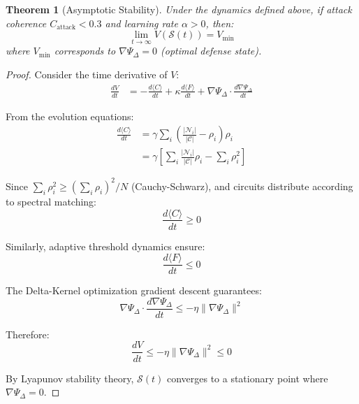 \documentclass[11pt,a4paper]{article}
\newtheorem{theorem}{Theorem}[section]
\begin{document}
\begin{theorem}[Asymptotic Stability]
Under the dynamics defined above, if attack coherence $C_{\text{attack}} < 0.3$ and learning rate $\alpha > 0$, then:
\begin{equation}
\lim_{t \to \infty} V(\mathcal{S}(t)) = V_{\min}
\end{equation}
where $V_{\min}$ corresponds to $\nabla \Psi_\Delta = 0$ (optimal defense state).
\end{theorem}

\begin{proof}
Consider the time derivative of $V$:
\begin{align}
\frac{dV}{dt} &= -\frac{d\langle C \rangle}{dt} + \kappa \frac{d\langle F \rangle}{dt} + \nabla \Psi_\Delta \cdot \frac{d\nabla \Psi_\Delta}{dt}
\end{align}

From the evolution equations:
\begin{align}
\frac{d\langle C \rangle}{dt} &= \gamma \sum_i \left( \frac{|\mathcal{N}_i|}{|\mathcal{C}|} - \rho_i \right) \rho_i \\
&= \gamma \left[ \sum_i \frac{|\mathcal{N}_i|}{|\mathcal{C}|} \rho_i - \sum_i \rho_i^2 \right]
\end{align}

Since $\sum_i \rho_i^2 \geq \left(\sum_i \rho_i\right)^2 / N$ (Cauchy-Schwarz), and circuits distribute according to spectral matching:
\begin{equation}
\frac{d\langle C \rangle}{dt} \geq 0
\end{equation}

Similarly, adaptive threshold dynamics ensure:
\begin{equation}
\frac{d\langle F \rangle}{dt} \leq 0
\end{equation}

The Delta-Kernel optimization gradient descent guarantees:
\begin{equation}
\nabla \Psi_\Delta \cdot \frac{d\nabla \Psi_\Delta}{dt} \leq -\eta \|\nabla \Psi_\Delta\|^2
\end{equation}

Therefore:
\begin{equation}
\frac{dV}{dt} \leq -\eta \|\nabla \Psi_\Delta\|^2 \leq 0
\end{equation}

By Lyapunov stability theory, $\mathcal{S}(t)$ converges to a stationary point where $\nabla \Psi_\Delta = 0$.
\end{proof}
\end{document}
